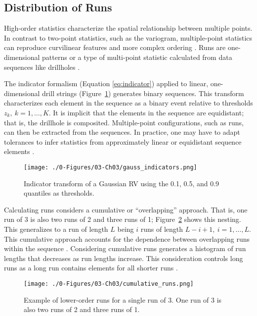 \subsection{Distribution of Runs}
\label{subsec:03runs}

High-order statistics characterize the spatial relationship between multiple points. In contrast to two-point statistics, such as the variogram, multiple-point statistics can reproduce curvilinear features and more complex ordering \citep{guardiano1993multivariate}. Runs are one-dimensional patterns or a type of multi-point statistic calculated from data sequences like drillholes \citep{boisvert2007multiplepoint}.

The indicator formalism (Equation \ref{eq:indicator}) applied to linear, one-dimensional drill strings (Figure~\ref{fig:gauss_indicators}) generates binary sequences. This transform characterizes each element in the sequence as a binary event relative to thresholds $z_{k}, \ k=1,\dots,K$. It is implicit that the elements in the sequence are equidistant; that is, the drillhole is composited. Multiple-point configurations, such as runs, can then be extracted from the sequences. In practice, one may have to adapt tolerances to infer statistics from approximately linear or equidistant sequence elements \citep{ortiz2003characterization}.

\begin{figure}[htb!]
    \centering
    \texttt{[image: ./0-Figures/03-Ch03/gauss\_indicators.png]}
    \caption{Indicator transform of a Gaussian \gls{RV} using the 0.1, 0.5, and 0.9 quantiles as thresholds. }
    \label{fig:gauss_indicators}
\end{figure}

Calculating runs considers a cumulative or ``overlapping'' approach. That is, one run of 3 is also two runs of 2 and three runs of 1; Figure~\ref{fig:cumulative_runs} shows this nesting. This generalizes to a run of length $L$ being $i$ runs of length $L-i+1, \ i=1,\dots,L$. This cumulative approach accounts for the dependence between overlapping runs within the sequence \citep{fu2003distribution}. Considering cumulative runs generates a histogram of run lengths that decreases as run lengths increase. This consideration controls long runs as a long run contains elements for all shorter runs \citep{ortiz2003characterization}.

\begin{figure}[htb!]
    \centering
    \texttt{[image: ./0-Figures/03-Ch03/cumulative\_runs.png]}
    \caption{Example of lower-order runs for a single run of 3. One run of 3 is also two runs of 2 and three runs of 1.}
    \label{fig:cumulative_runs}
\end{figure}

